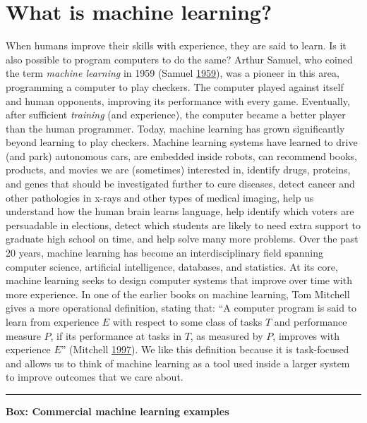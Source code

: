 \documentclass[]{krantz}
\begin{document}
\section{What is machine learning?}\label{what-is-machine-learning}

When humans improve their skills with experience, they are said to
learn. Is it also possible to program computers to do the same? Arthur
Samuel, who coined the term \emph{machine learning} in 1959 (Samuel
\protect\hyperlink{ref-samuel1959some}{1959}), was a pioneer in this
area, programming a computer to play checkers. The computer played
against itself and human opponents, improving its performance with every
game. Eventually, after sufficient \emph{training} (and experience), the
computer became a better player than the human programmer. Today,
machine learning has grown significantly beyond learning to play
checkers. Machine learning systems have learned to drive (and park)
autonomous cars, are embedded inside robots, can recommend books,
products, and movies we are (sometimes) interested in, identify drugs,
proteins, and genes that should be investigated further to cure
diseases, detect cancer and other pathologies in x-rays and other types
of medical imaging, help us understand how the human brain learns
language, help identify which voters are persuadable in elections,
detect which students are likely to need extra support to graduate high
school on time, and help solve many more problems. Over the past 20
years, machine learning has become an interdisciplinary field spanning
computer science, artificial intelligence, databases, and statistics. At
its core, machine learning seeks to design computer systems that improve
over time with more experience. In one of the earlier books on machine
learning, Tom Mitchell gives a more operational definition, stating
that: ``A computer program is said to learn from experience \(E\) with
respect to some class of tasks \(T\) and performance measure \(P\), if
its performance at tasks in \(T\), as measured by \(P\), improves with
experience \(E\)'' (Mitchell
\protect\hyperlink{ref-mitchell1997machine}{1997}). We like this
definition because it is task-focused and allows us to think of machine
learning as a tool used inside a larger system to improve outcomes that
we care about.

\begin{center}\rule{0.5\linewidth}{\linethickness}\end{center}

\textbf{Box: Commercial machine learning examples}
\end{document}
